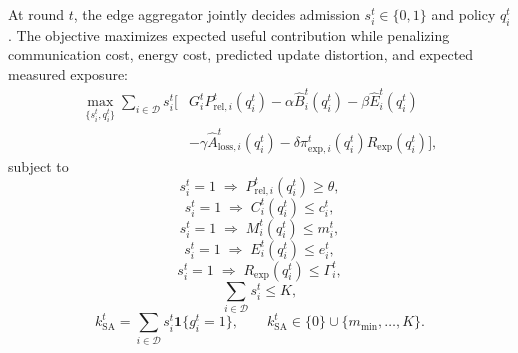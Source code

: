 \documentclass[preprint,12pt]{elsarticle}
\begin{document}
At round $t$, the edge aggregator jointly decides admission $s_i^t\in\{0,1\}$ and policy $q_i^t$. The objective maximizes expected useful contribution while penalizing communication cost, energy cost, predicted update distortion, and expected measured exposure:
\begin{equation}
	\begin{aligned}
		\max_{\{s_i^t,q_i^t\}}
		\sum_{i \in \mathcal{D}}
		s_i^t
		\Big[
		&G_i^t P_{\mathrm{rel},i}^{t}(q_i^t)
		- \alpha \hat{B}_i^t(q_i^t)
		- \beta \hat{E}_i^t(q_i^t)  \\
		&- \gamma \hat{A}_{\mathrm{loss},i}^t(q_i^t)
		- \delta \pi_{\mathrm{exp},i}^t(q_i^t)R_{\mathrm{exp}}(q_i^t)
		\Big],
	\end{aligned}
	\label{eq:objective}
\end{equation}
subject to
\begin{equation}
	s_i^t=1\;\Longrightarrow\;P_{\mathrm{rel},i}^{t}(q_i^t) \geq \theta,
	\label{eq:reliability_constraint}
\end{equation}
\begin{equation}
	s_i^t=1\;\Longrightarrow\;C_i^t(q_i^t) \leq c_i^t,
	\label{eq:cpu_constraint}
\end{equation}
\begin{equation}
	s_i^t=1\;\Longrightarrow\;M_i^t(q_i^t) \leq m_i^t,
	\label{eq:memory_constraint}
\end{equation}
\begin{equation}
	s_i^t=1\;\Longrightarrow\;E_i^t(q_i^t) \leq e_i^t,
	\label{eq:energy_constraint}
\end{equation}
\begin{equation}
	s_i^t=1\;\Longrightarrow\;R_{\mathrm{exp}}(q_i^t) \leq \Gamma_i^t,
	\label{eq:risk_constraint}
\end{equation}
\begin{equation}
	\sum_{i \in \mathcal{D}} s_i^t \leq K,
	\label{eq:admission_constraint}
\end{equation}
\begin{equation}
	k_{\mathrm{SA}}^t=
	\sum_{i \in \mathcal{D}} s_i^t \mathbf{1}\{g_i^t=1\},
	\qquad
	k_{\mathrm{SA}}^t\in\{0\}\cup\{m_{\min},\ldots,K\}.
	\label{eq:secagg_group_constraint}
\end{equation}
\end{document}
